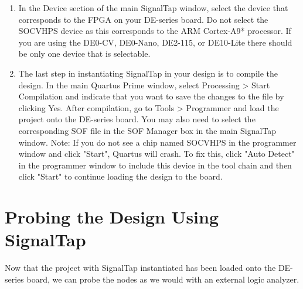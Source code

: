 \documentclass[11pt, twoside, pdftex]{article}
\begin{document}
\begin{enumerate}
\item In the Device section of the main SignalTap window, select the device that corresponds to the FPGA on your DE-series board.
Do not select the {\sf SOCVHPS} device as this corresponds to the ARM Cortex-A9* processor.
If you are using the DE0-CV, DE0-Nano, DE2-115, or DE10-Lite there should be only one device that is selectable.
\item The last step in instantiating SignalTap in your design is to compile the design. In the main Quartus Prime window,
select {\sf Processing > Start Compilation} and indicate that you want to save the changes to the file by clicking {\sf Yes}.
After compilation, go to {\sf Tools > Programmer} and load
the project onto the DE-series board. You may also need to select the corresponding SOF file in the SOF Manager box in the main SignalTap window.
Note: If you do not see a chip named SOCVHPS in the programmer window and click "Start", Quartus will crash. To fix this, click "Auto Detect" in the programmer window to 
include this device in the tool chain and then click "Start" to continue loading the design to the board.
\end{enumerate}

\section{Probing the Design Using SignalTap}

Now that the project with SignalTap instantiated has been loaded onto the DE-series board, we can
probe the nodes as we would with an external logic analyzer.
\end{document}
